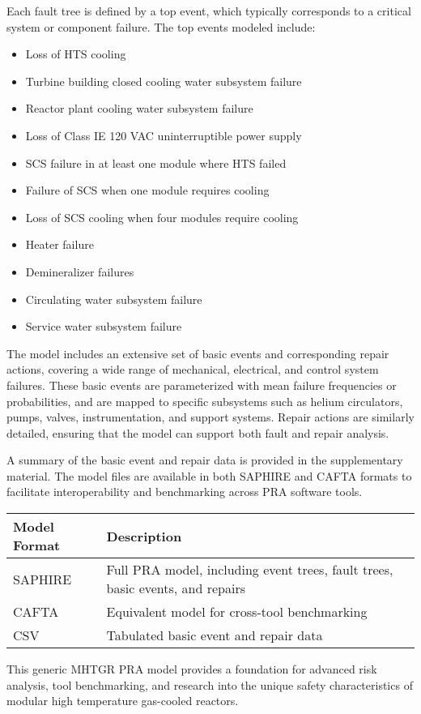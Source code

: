 Each fault tree is defined by a top event, which typically corresponds to a critical system or component failure. The top events modeled include:

\begin{itemize}
    \item Loss of HTS cooling
    \item Turbine building closed cooling water subsystem failure
    \item Reactor plant cooling water subsystem failure
    \item Loss of Class IE 120 VAC uninterruptible power supply
    \item SCS failure in at least one module where HTS failed
    \item Failure of SCS when one module requires cooling
    \item Loss of SCS cooling when four modules require cooling
    \item Heater failure
    \item Demineralizer failures
    \item Circulating water subsystem failure
    \item Service water subsystem failure
\end{itemize}

The model includes an extensive set of basic events and corresponding repair actions, covering a wide range of mechanical, electrical, and control system failures. These basic events are parameterized with mean failure frequencies or probabilities, and are mapped to specific subsystems such as helium circulators, pumps, valves, instrumentation, and support systems. Repair actions are similarly detailed, ensuring that the model can support both fault and repair analysis.

A summary of the basic event and repair data is provided in the supplementary material. The model files are available in both SAPHIRE and CAFTA formats to facilitate interoperability and benchmarking across PRA software tools.

\begin{center}
\begin{tabular}{ll}
\textbf{Model Format} & \textbf{Description} \\
\hline
SAPHIRE & Full PRA model, including event trees, fault trees, basic events, and repairs \\
CAFTA   & Equivalent model for cross-tool benchmarking \\
CSV     & Tabulated basic event and repair data \\
\end{tabular}
\end{center}

This generic MHTGR PRA model provides a foundation for advanced risk analysis, tool benchmarking, and research into the unique safety characteristics of modular high temperature gas-cooled reactors.
